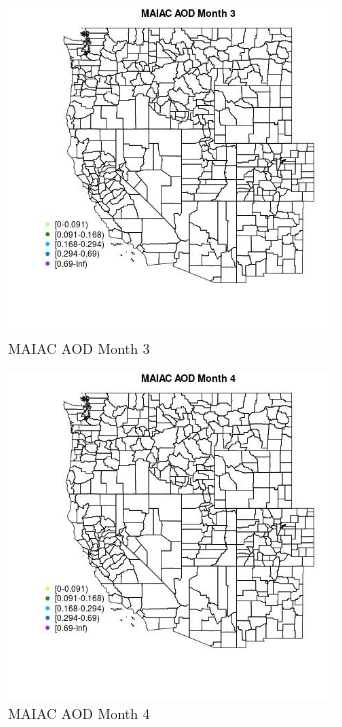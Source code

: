 \begin{figure} 
\centering  
\includegraphics[width=0.77\textwidth]{Code_Outputs/Report_ML_input_PM25_Step4_part_e_de_duplicated_aveswNAs_MapObsMo3MAIAC_AOD.jpg} 
\caption{\label{fig:Report_ML_input_PM25_Step4_part_e_de_duplicated_aveswNAsMapObsMo3MAIAC_AOD}MAIAC AOD Month 3} 
\end{figure} 
 

\begin{figure} 
\centering  
\includegraphics[width=0.77\textwidth]{Code_Outputs/Report_ML_input_PM25_Step4_part_e_de_duplicated_aveswNAs_MapObsMo4MAIAC_AOD.jpg} 
\caption{\label{fig:Report_ML_input_PM25_Step4_part_e_de_duplicated_aveswNAsMapObsMo4MAIAC_AOD}MAIAC AOD Month 4} 
\end{figure} 
 

